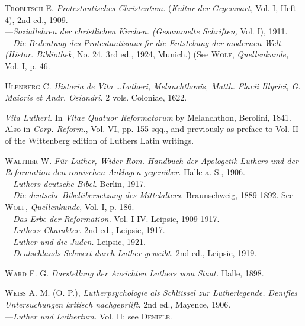 \textsc{Troeltsch E.} \textit{Protestantisches Christentum.} (\textit{Kultur der Gegenwart,} Vol.
I, Heft 4), 2nd ed., 1909. \\
---\textit{Soziallehren der christlichen Kirchen. (Gesammelte Schriften,} Vol. I),
1911. \\
---\textit{Die Bedeutung des Protestantismus fir die Entstebung der modernen
Welt. (Histor. Bibliothek}, No. 24. 3rd ed., 1924, Munich.) (See \textsc{Wolf,}
\textit{Quellenkunde,} Vol. I, p. 46.

\textsc{Ulenberg C.} \textit{Historia de Vita \dots Lutheri, Melanchthonis, Matth. Flacii
Illyrici, G. Maioris et Andr. Osiandri.} 2 vols. Coloniae, 1622.

\textit{Vita Lutheri.} In \textit{Vitae Quatuor Reformatorum} by Melanchthon, Berolini,
1841. Also in \textit{Corp. Reform.}, Vol. VI, pp. 155 sqq., and previously as preface
to Vol. II of the Wittenberg edition of Luthers Latin writings.

\textsc{Walther W.} \textit{Für Luther, Wider Rom. Handbuch der Apologetik Luthers
und der Reformation den romischen Anklagen gegenüber.} Halle a. S., 1906. \\
---\textit{Luthers deutsche Bibel.} Berlin, 1917. \\
---\textit{Die deutsche Bibeliibersetzung des Mittelalters.} Braunschweig, 1889-1892.
See \textsc{Wolf}, \textit{Quellenkunde}, Vol. I, p. 186. \\
---\textit{Das Erbe der Reformation.} Vol. I-IV. Leipsic, 1909-1917. \\
---\textit{Luthers Charakter.} 2nd ed., Leipsic, 1917. \\
---\textit{Luther und die Juden.} Leipsic, 1921. \\
---\textit{Deutschlands Schwert durch Luther geweibt.} 2nd ed., Leipsic, 1919.

\textsc{Ward F. G.} \textit{Darstellung der Ansichten Luthers vom Staat.} Halle, 1898.

\textsc{Weiss A. M. (O. P.)}, \textit{Lutherpsychologie als Schliissel zur Lutherlegende.
Denifles Untersuchungen kritisch nachgepriift.} 2nd ed., Mayence, 1906. \\
---\textit{Luther und Luthertum.} Vol. II; see \textsc{Denifle.}

